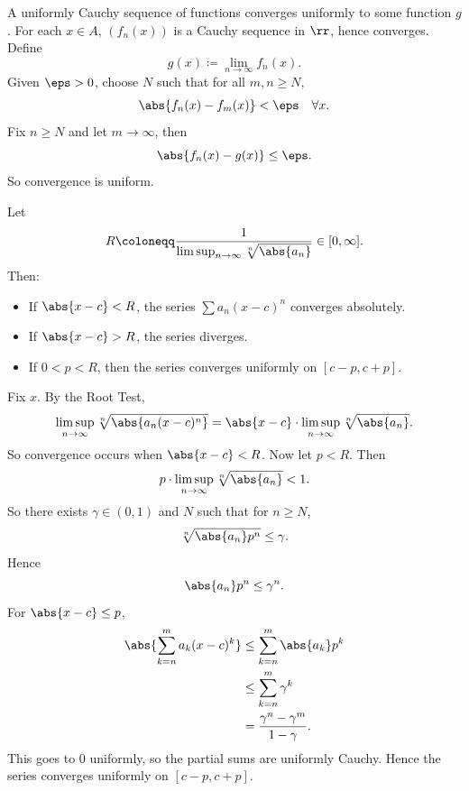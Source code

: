 \begin{proposition}{
    A uniformly Cauchy sequence of functions converges uniformly to some function $g$.
}
    For each $x \in A$, $(f_n(x))$ is a Cauchy sequence in $\rr$, hence converges.
    Define
    \[
        g(x) \coloneqq \lim_{n\to\infty} f_n(x).
    \]
    Given $\eps > 0$, choose $N$ such that for all $m,n \geq N$,
    \[
        \abs{f_n(x) - f_m(x)} < \eps \quad \forall x.
    \]
    Fix $n \geq N$ and let $m \to \infty$, then
    \[
        \abs{f_n(x) - g(x)} \leq \eps.
    \]
    So convergence is uniform.
\end{proposition}

\begin{theorem}{
    Let
    \[
        R \coloneqq \frac{1}{\limsup_{n\to\infty} \sqrt[n]{\abs{a_n}}} \in [0,\infty].
    \]
    Then:
    \begin{itemize}
        \item If $\abs{x-c} < R$, the series $\sum a_n(x-c)^n$ converges absolutely.
        \item If $\abs{x-c} > R$, the series diverges.
        \item If $0 < p < R$, then the series converges uniformly on $[c-p,c+p]$.
    \end{itemize}
}
    Fix $x$.
    By the Root Test,
    \[
        \limsup_{n\to\infty} \sqrt[n]{\abs{a_n(x-c)^n}}
        = \abs{x-c}\cdot \limsup_{n\to\infty} \sqrt[n]{\abs{a_n}}.
    \]
    So convergence occurs when $\abs{x-c} < R$.
    Now let $p < R$.
    Then
    \[
        p \cdot \limsup_{n\to\infty} \sqrt[n]{\abs{a_n}} < 1.
    \]
    So there exists $\gamma \in (0,1)$ and $N$ such that for $n \geq N$,
    \[
        \sqrt[n]{\abs{a_n} p^n} \leq \gamma.
    \]
    Hence
    \[
        \abs{a_n} p^n \leq \gamma^n.
    \]
    For $\abs{x-c} \leq p$,
    \begin{align*}
        \abs{\sum_{k=n}^m a_k (x-c)^k}
        &\leq \sum_{k=n}^m \abs{a_k} p^k \\
        &\leq \sum_{k=n}^m \gamma^k \\
        &= \frac{\gamma^n - \gamma^m}{1-\gamma}.
    \end{align*}
    This goes to $0$ uniformly, so the partial sums are uniformly Cauchy.
    Hence the series converges uniformly on $[c-p,c+p]$.
\end{theorem}